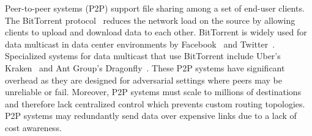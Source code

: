 Peer-to-peer systems (P2P) support file sharing among a set of end-user clients.
% 
The BitTorrent protocol~\cite{cohen2003incentives} reduces the network load on the source by allowing clients to upload and download data to each other. 
% 
BitTorrent is widely used for data multicast in data center environments by Facebook~\cite{facebook-bittorrent} and Twitter~\cite{twitter-bittorrent}.
% 
Specialized systems for data multicast that use BitTorrent include Uber's Kraken~\cite{uber-kraken} and Ant Group's Dragonfly~\cite{dragonfly}.
% 
These P2P systems have significant overhead as they are designed for adversarial settings where peers may be unreliable or fail.
% 
Moreover, P2P systems must scale to millions of destinations and therefore lack centralized control which prevents custom routing topologies.
% 
P2P systems may redundantly send data over expensive links due to a lack of cost awareness. 


